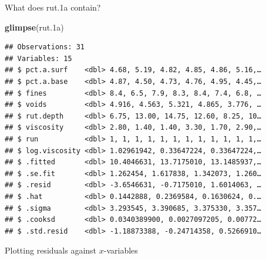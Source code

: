 \documentclass[ignorenonframetext,]{beamer}
\newenvironment{Shaded}{\begin{snugshade}}{\end{snugshade}}
\newcommand{\DataTypeTok}[1]{\textcolor[rgb]{0.13,0.29,0.53}{#1}}
\newcommand{\FloatTok}[1]{\textcolor[rgb]{0.00,0.00,0.81}{#1}}
\newcommand{\KeywordTok}[1]{\textcolor[rgb]{0.13,0.29,0.53}{\textbf{#1}}}
\newcommand{\NormalTok}[1]{#1}
\newcommand{\OperatorTok}[1]{\textcolor[rgb]{0.81,0.36,0.00}{\textbf{#1}}}
\newcommand{\StringTok}[1]{\textcolor[rgb]{0.31,0.60,0.02}{#1}}
\begin{document}
\begin{frame}[fragile]{What does rut.1a contain?}
\protect\hypertarget{what-does-rut.1a-contain}{}

\footnotesize

\begin{Shaded}
\begin{Highlighting}[]
\KeywordTok{glimpse}\NormalTok{(rut}\FloatTok{.1}\NormalTok{a)}
\end{Highlighting}
\end{Shaded}

\begin{verbatim}
## Observations: 31
## Variables: 15
## $ pct.a.surf    <dbl> 4.68, 5.19, 4.82, 4.85, 4.86, 5.16,…
## $ pct.a.base    <dbl> 4.87, 4.50, 4.73, 4.76, 4.95, 4.45,…
## $ fines         <dbl> 8.4, 6.5, 7.9, 8.3, 8.4, 7.4, 6.8, …
## $ voids         <dbl> 4.916, 4.563, 5.321, 4.865, 3.776, …
## $ rut.depth     <dbl> 6.75, 13.00, 14.75, 12.60, 8.25, 10…
## $ viscosity     <dbl> 2.80, 1.40, 1.40, 3.30, 1.70, 2.90,…
## $ run           <dbl> 1, 1, 1, 1, 1, 1, 1, 1, 1, 1, 1, 1,…
## $ log.viscosity <dbl> 1.02961942, 0.33647224, 0.33647224,…
## $ .fitted       <dbl> 10.4046631, 13.7175010, 13.1485937,…
## $ .se.fit       <dbl> 1.262454, 1.617838, 1.342073, 1.260…
## $ .resid        <dbl> -3.6546631, -0.7175010, 1.6014063, …
## $ .hat          <dbl> 0.1442888, 0.2369584, 0.1630624, 0.…
## $ .sigma        <dbl> 3.293545, 3.390685, 3.375330, 3.357…
## $ .cooksd       <dbl> 0.0340389900, 0.0027097205, 0.00772…
## $ .std.resid    <dbl> -1.18873388, -0.24714358, 0.5266910…
\end{verbatim}

\normalsize

\end{frame}

\begin{frame}[fragile]{Plotting residuals against \(x\)-variables}
\protect\hypertarget{plotting-residuals-against-x-variables-1}{}

\begin{Shaded}
\end{Shaded}

\end{frame}
\end{document}
